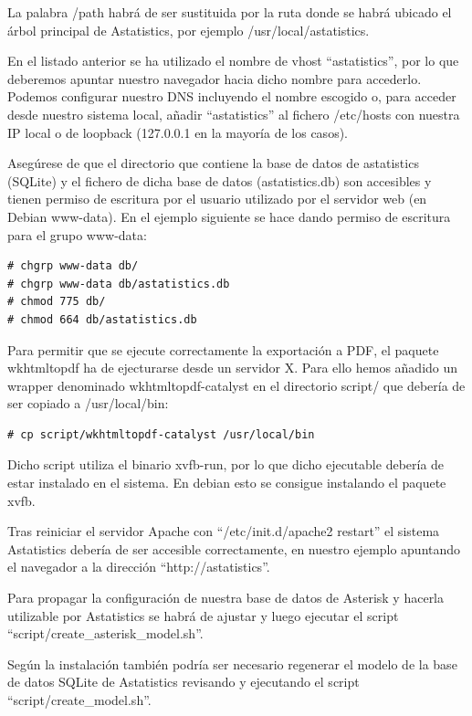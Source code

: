 \documentclass[spanish,12pt]{book}
\begin{document}
La palabra /path habrá de ser sustituida por la ruta donde se habrá ubicado el árbol principal de Astatistics, por ejemplo /usr/local/astatistics.

En el listado anterior se ha utilizado el nombre de vhost ``astatistics'', por lo que deberemos apuntar nuestro navegador hacia dicho nombre para accederlo. Podemos configurar nuestro DNS incluyendo el nombre escogido o, para acceder desde nuestro sistema local, añadir ``astatistics'' al fichero /etc/hosts con nuestra IP local o de loopback (127.0.0.1 en la mayoría de los casos).

Asegúrese de que el directorio que contiene la base de datos de astatistics (SQLite) y el fichero de dicha base de datos (astatistics.db) son accesibles y tienen permiso de escritura por el usuario utilizado por el servidor web (en Debian www-data). En el ejemplo siguiente se hace dando permiso de escritura para el grupo www-data:

\begin{lstlisting}
# chgrp www-data db/
# chgrp www-data db/astatistics.db
# chmod 775 db/
# chmod 664 db/astatistics.db
\end{lstlisting}

Para permitir que se ejecute correctamente la exportación a PDF, el paquete wkhtmltopdf ha de ejecturarse desde un servidor X. Para ello hemos añadido un wrapper denominado wkhtmltopdf-catalyst en el directorio script/ que debería de ser copiado a /usr/local/bin:

\begin{lstlisting}
# cp script/wkhtmltopdf-catalyst /usr/local/bin
\end{lstlisting}

Dicho script utiliza el binario xvfb-run, por lo que dicho ejecutable debería de estar instalado en el sistema. En debian esto se consigue instalando el paquete xvfb.

Tras reiniciar el servidor Apache con ``/etc/init.d/apache2 restart'' el sistema Astatistics debería de ser accesible correctamente, en nuestro ejemplo apuntando el navegador a la dirección ``http://astatistics''.

Para propagar la configuración de nuestra base de datos de Asterisk y hacerla utilizable por Astatistics se habrá de ajustar y luego ejecutar el script ``script/create\_asterisk\_model.sh''.

Según la instalación también podría ser necesario regenerar el modelo de la base de datos SQLite de Astatistics revisando y ejecutando el script ``script/create\_model.sh''.
\end{document}
